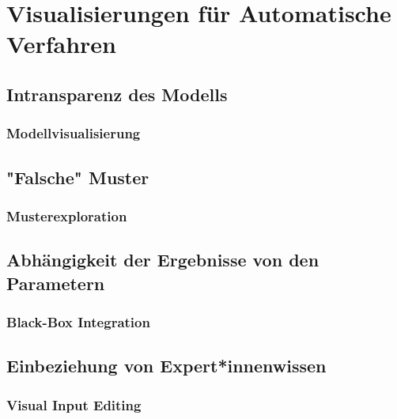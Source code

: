     \section{Visualisierungen für Automatische Verfahren} %

        \subsection{Intransparenz des Modells} %

            \subsubsection{Modellvisualisierung} %

        \subsection{"Falsche" Muster} %

            \subsubsection{Musterexploration} %

        \subsection{Abhängigkeit der Ergebnisse von den Parametern} %

            \subsubsection{Black-Box Integration} %

        \subsection{Einbeziehung von Expert*innenwissen} %

            \subsubsection{Visual Input Editing} %

